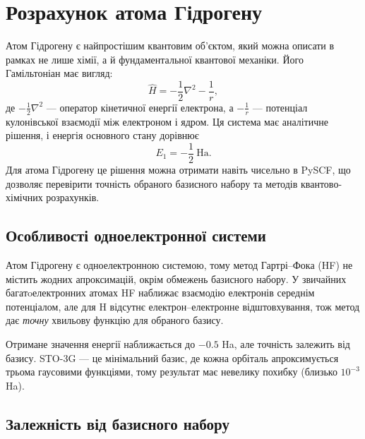 

\section{Розрахунок атома Гідрогену}

Атом Гідрогену є найпростішим квантовим об'єктом, який можна описати в рамках не лише хімії, а й фундаментальної квантової механіки. Його Гамільтоніан має вигляд:
\[
\hat{H} = -\frac{1}{2}\nabla^2 - \frac{1}{r},
\]
де \(-\frac{1}{2}\nabla^2\) --- оператор кінетичної енергії електрона, а \(-\frac{1}{r}\) --- потенціал кулонівської взаємодії між електроном і ядром.
Ця система має аналітичне рішення, і енергія основного стану дорівнює
\[
E_1 = -\frac{1}{2}\ \text{Ha}.
\]
Для атома Гідрогену це рішення можна отримати навіть чисельно в PySCF, що дозволяє перевірити точність обраного базисного набору та методів квантово-хімічних розрахунків.

\subsection{Особливості одноелектронної системи}

Атом Гідрогену є одноелектронною системою, тому метод Гартрі–Фока (HF) не містить жодних апроксимацій, окрім обмежень базисного набору.
У звичайних багатoелектронних атомах HF наближає взаємодію електронів середнім потенціалом, але для H відсутнє електрон–електронне відштовхування, тож метод дає \emph{точну} хвильову функцію для обраного базису.


Отримане значення енергії наближається до \(-0.5\) Ha, але точність залежить від базису. STO-3G --- це мінімальний базис, де кожна орбіталь апроксимується трьома гаусовими функціями, тому результат має невелику похибку (близько \(10^{-3}\) Ha).

\subsection{Залежність від базисного набору}

